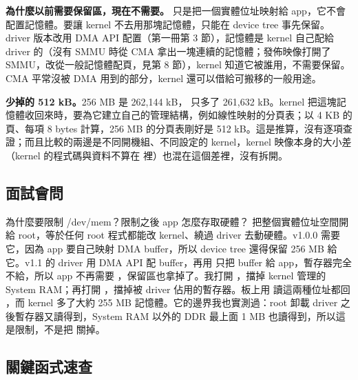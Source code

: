 \textbf{為什麼以前需要保留區，現在不需要。} 只是把一個實體位址映射給 app，它不會配置記憶體。要讓 kernel 不去用那塊記憶體，只能在 device tree 事先保留。driver 版本改用 DMA API 配置（第一冊第 3 節），記憶體是 kernel 自己配給 driver 的（沒有 SMMU 時從 CMA 拿出一塊連續的記憶體；發佈映像打開了 SMMU，改從一般記憶體配頁，見第 8 節），kernel 知道它被誰用，不需要保留。CMA 平常沒被 DMA 用到的部分，kernel 還可以借給可搬移的一般用途。

\textbf{少掉的 512 kB。}256 MB 是 262,144 kB， 只多了 261,632 kB。kernel 把這塊記憶體收回來時，要為它建立自己的管理結構，例如線性映射的分頁表；以 4 KB 的頁、每項 8 bytes 計算，256 MB 的分頁表剛好是 512 kB。這是推算，沒有逐項查證；而且比較的兩邊是不同開機組、不同設定的 kernel，kernel 映像本身的大小差（kernel 的程式碼與資料不算在  裡）也混在這個差裡，沒有拆開。

\subsection{面試會問}

\begin{qa}{為什麼要限制 /dev/mem？限制之後 app 怎麼存取硬體？}
 把整個實體位址空間開給 root，等於任何 root 程式都能改 kernel、繞過 driver 去動硬體。v1.0.0 需要它，因為 app 要自己映射 DMA buffer，所以 device tree 還得保留 256 MB 給它。v1.1 的 driver 用 DMA API 配 buffer，再用  只把 buffer 給 app，暫存器完全不給，所以 app 不再需要 ，保留區也拿掉了。我打開 ，擋掉 kernel 管理的 System RAM；再打開 ，擋掉被 driver 佔用的暫存器。板上用  讀這兩種位址都回 ，而 kernel 多了大約 255 MB 記憶體。它的邊界我也實測過：root 卸載 driver 之後暫存器又讀得到，System RAM 以外的 DDR 最上面 1 MB 也讀得到，所以這是限制，不是把  關掉。
\end{qa}

\subsection{關鍵函式速查}


